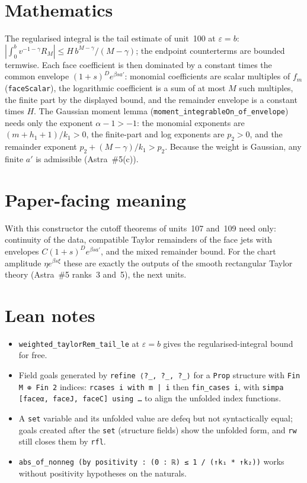 \documentclass[11pt]{article}
\begin{document}
\section{Mathematics}

The regularised integral is the tail estimate of unit~100 at $\varepsilon=b$:
$|\int_0^bv^{-1-\gamma}R_M|\le H\,b^{M-\gamma}/(M-\gamma)$; the endpoint counterterms are bounded
termwise. Each face coefficient is then dominated by a constant times the common envelope
$(1+s)^De^{\beta sa'}$: monomial coefficients are scalar multiples of $f_m$
(\texttt{faceScalar}), the logarithmic coefficient is a sum of at most $M$ such multiples, the
finite part by the displayed bound, and the remainder envelope is a constant times $H$. The
Gaussian moment lemma (\texttt{moment\_integrableOn\_of\_envelope}) needs only the exponent
$\alpha-1>-1$: the monomial exponents are $(m+h_1+1)/k_1>0$, the finite-part and log exponents are
$p_2>0$, and the remainder exponent $p_2+(M-\gamma)/k_1>p_2$. Because the weight is Gaussian, any
finite $a'$ is admissible (Astra~\#5(c)).

\section{Paper-facing meaning}

With this constructor the cutoff theorems of units~107 and~109 need only: continuity of the data,
compatible Taylor remainders of the face jets with envelopes $C(1+s)^De^{\beta sa'}$, and the
mixed remainder bound. For the chart amplitude $\eta e^{\beta s\xi}$ these are exactly the outputs of
the smooth rectangular Taylor theory (Astra~\#5 ranks~3 and~5), the next units.

\section{Lean notes}

\begin{itemize}
\item \texttt{weighted\_taylorRem\_tail\_le} at $\varepsilon=b$ gives the regularised-integral bound
for free.
\item Field goals generated by \texttt{refine ⟨?\_, ?\_, ?\_⟩} for a \texttt{Prop} structure with
\texttt{Fin M ⊕ Fin 2} indices: \texttt{rcases i with m | i} then \texttt{fin\_cases i}, with
\texttt{simpa [faceα, faceJ, faceC] using …} to align the unfolded index functions.
\item A \texttt{set} variable and its unfolded value are defeq but not syntactically equal; goals
created after the \texttt{set} (structure fields) show the unfolded form, and \texttt{rw} still
closes them by \texttt{rfl}.
\item \texttt{abs\_of\_nonneg (by positivity : (0 : ℝ) ≤ 1 / (↑k₁ * ↑k₂))} works without
positivity hypotheses on the naturals.
\end{itemize}
\end{document}
